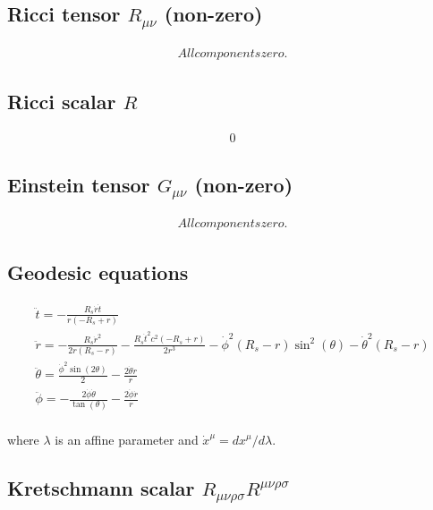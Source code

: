 \documentclass{article}
\begin{document}
\subsection{Ricci tensor $R_{\mu\nu}$ (non-zero)}
\begin{align}
All components zero.
\end{align}

\subsection{Ricci scalar $R$}
\begin{align}
0
\end{align}

\subsection{Einstein tensor $G_{\mu\nu}$ (non-zero)}
\begin{align}
All components zero.
\end{align}

\subsection{Geodesic equations}
\begin{align}
\ddot{t} = - \frac{R_{s} \dot{r} \dot{t}}{r \left(- R_{s} + r\right)} \\
\ddot{r} = - \frac{R_{s} \dot{r}^{2}}{2 r \left(R_{s} - r\right)} - \frac{R_{s} \dot{t}^{2} c^{2} \left(- R_{s} + r\right)}{2 r^{3}} - \dot{\phi}^{2} \left(R_{s} - r\right) \sin^{2}{\left(\theta \right)} - \dot{\theta}^{2} \left(R_{s} - r\right) \\
\ddot{\theta} = \frac{\dot{\phi}^{2} \sin{\left(2 \theta \right)}}{2} - \frac{2 \dot{\theta} \dot{r}}{r} \\
\ddot{\phi} = - \frac{2 \dot{\phi} \dot{\theta}}{\tan{\left(\theta \right)}} - \frac{2 \dot{\phi} \dot{r}}{r} \\
\end{align}

where $\lambda$ is an affine parameter and $\dot{x}^\mu = dx^\mu/d\lambda$.

\subsection{Kretschmann scalar $R_{\mu\nu\rho\sigma}R^{\mu\nu\rho\sigma}$}
\end{document}
